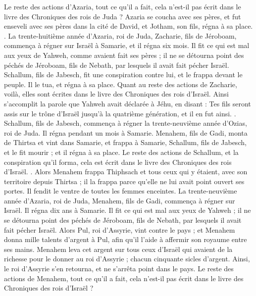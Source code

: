 \begin{multicols}{2}
Le reste des actions d'Azaria, tout ce qu'il a fait, cela n'est-il pas écrit dans le livre des Chroniques des rois de Juda ?
Azaria se coucha avec ses pères, et fut enseveli avec ses pères dans la cité de David, et Jotham, son fils, régna à sa place.
.
La trente-huitième année d'Azaria, roi de Juda, Zacharie, fils de Jéroboam, commença à régner sur Israël à Samarie, et il régna six mois.
Il fit ce qui est mal aux yeux de Yahweh, comme avaient fait ses pères ; il ne se détourna point des péchés de Jéroboam, fils de Nebath, par lesquels il avait fait pécher Israël.
Schallum, fils de Jabesch, fit une conspiration contre lui, et le frappa devant le peuple. Il le tua, et régna à sa place.
Quant au reste des actions de Zacharie, voilà, elles sont écrites dans le livre des Chroniques des rois d'Israël.
Ainsi s'accomplit la parole que Yahweh avait déclarée à Jéhu, en disant : Tes fils seront assis sur le trône d'Israël jusqu'à la quatrième génération, et il en fut ainsi.
.
Schallum, fils de Jabesch, commença à régner la trente-neuvième année d'Ozias, roi de Juda. Il régna pendant un mois à Samarie.
Menahem, fils de Gadi, monta de Thirtsa et vint dans Samarie, et frappa à Samarie, Schallum, fils de Jabesch, et le fit mourir ; et il régna à sa place.
Le reste des actions de Schallum, et la conspiration qu'il forma, cela est écrit dans le livre des Chroniques des rois d'Israël.
.
Alors Menahem frappa Thiphsach et tous ceux qui y étaient, avec son territoire depuis Thirtsa ; il la frappa parce qu'elle ne lui avait point ouvert ses portes. Il fendit le ventre de toutes les femmes enceintes.
La trente-neuvième année d'Azaria, roi de Juda, Menahem, fils de Gadi, commença à régner sur Israël. Il régna dix ans à Samarie.
Il fit ce qui est mal aux yeux de Yahweh ; il ne se détourna point des péchés de Jéroboam, fils de Nebath, par lesquels il avait fait pécher Israël.
Alors Pul, roi d'Assyrie, vint contre le pays ; et Menahem donna mille talents d'argent à Pul, afin qu'il l'aide à affermir son royaume entre ses mains.
Menahem leva cet argent sur tous ceux d'Israël qui avaient de la richesse pour le donner au roi d'Assyrie ; chacun cinquante sicles d'argent. Ainsi, le roi d'Assyrie s'en retourna, et ne s'arrêta point dans le pays.
Le reste des actions de Menahem, tout ce qu'il a fait, cela n'est-il pas écrit dans le livre des Chroniques des rois d'Israël ?

\end{multicols}
